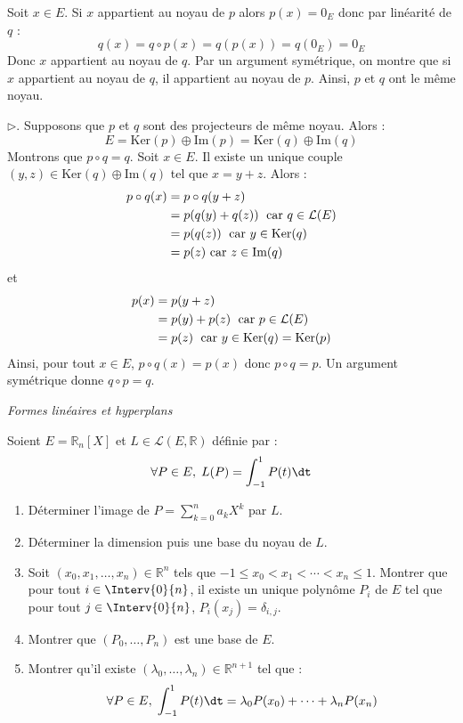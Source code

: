 \documentclass[a4paper,10pt]{report}
\begin{document}
\medskip

\noindent Soit $x \in E$. Si $x$ appartient au noyau de $p$ alors $p(x) = 0_E$ donc par linéarité de $q$ :
$$ q(x)= q \circ p(x) = q(p(x))=q(0_E) = 0_E$$
Donc $x$ appartient au noyau de $q$. Par un argument symétrique, on montre que si $x$ appartient au noyau de $q$, il appartient au noyau de $p$. Ainsi, $p$ et $q$ ont le même noyau.

\medskip

\noindent $\rhd$. Supposons que $p$ et $q$ sont des projecteurs de même noyau. Alors :
$$ E = \textrm{Ker}(p) \oplus \textrm{Im}(p) = \textrm{Ker}(q) \oplus \textrm{Im}(q)$$
Montrons que $p \circ q= q$. Soit $x \in E$. Il existe un unique couple $(y,z) \in \textrm{Ker}(q) \oplus \textrm{Im}(q)$ tel que $x=y+z$. Alors :
\begin{align*}
p \circ q(x) & = p\circ q (y+z) \\
& = p (q(y)+q(z))  \; \hbox{ car } q \in \mathcal{L}(E) \\
& = p (q(z))   \; \hbox{ car } y \in \textrm{Ker}(q) \\
& = p(z) \hbox{ car } z \in \textrm{Im}(q)
\end{align*}
et 
\begin{align*}
p(x) & = p(y+z) \\
& = p(y)+p(z) \; \hbox{ car } p \in \mathcal{L}(E) \\
& =  p(z) \; \hbox{ car } y \in \textrm{Ker}(q) = \textrm{Ker}(p)
\end{align*}
Ainsi, pour tout $x \in E$, $p \circ q(x)=p(x)$ donc $p \circ q = p$. Un argument symétrique donne $q \circ p = q$.





\medskip

\begin{center}
\textit{{ {\large Formes linéaires et hyperplans}}}
\end{center}

\medskip

\begin{Exercice}{} Soient $E= \mathbb{R}_n[X]$ et $L \in \mathcal{L}(E, \mathbb{R})$ définie par :
$$ \forall P \in E, \;  L(P) = \int_{-1}^1 P(t) \dt$$
\begin{enumerate}
\item Déterminer l'image de $P= \sum_{k=0}^n a_k X^k$ par $L$.
\item Déterminer la dimension puis une base du noyau de $L$.
\item Soit $(x_0, x_1, \ldots, x_n) \in \mathbb{R}^n$ tels que $-1 \leq x_0 < x_1 < \cdots < x_n \leq 1$. Montrer que pour tout $i \in \Interv{0}{n}$, il existe un unique polynôme $P_i$ de $E$ tel que pour tout $j \in \Interv{0}{n}$, $P_i(x_j)= \delta_{i,j}$.
\item Montrer que $(P_0, \ldots, P_n)$ est une base de $E$.
\item Montrer qu'il existe $(\lambda_0, \ldots, \lambda_n) \in \mathbb{R}^{n+1}$ tel que :
$$ \forall P \in E, \; \int_{-1}^1 P(t) \dt = \lambda_0 P(x_0) + \cdots + \lambda_n P(x_n)$$
\end{enumerate}
\end{Exercice}
\end{document}

